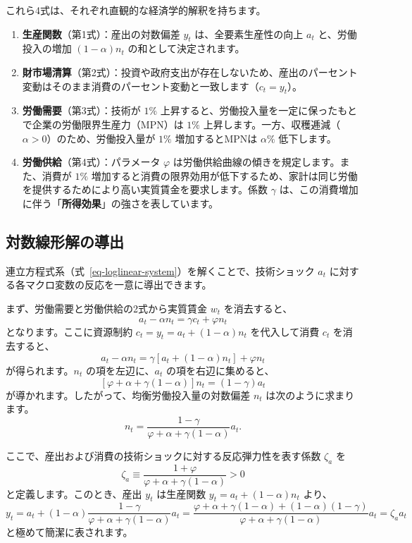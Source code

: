 \documentclass[
  japanese,
  lualatex,
  ja=standard,
  12pt,
  a4paper]{ltjsarticle}
\providecommand{\tightlist}{%
  \setlength{\itemsep}{0pt}\setlength{\parskip}{0pt}}
\begin{document}
これら4式は、それぞれ直観的な経済学的解釈を持ちます。

\begin{enumerate}
\def\labelenumi{\arabic{enumi}.}
\tightlist
\item
  \textbf{生産関数}（第1式）：産出の対数偏差 \(y_t\)
  は、全要素生産性の向上 \(a_t\) と、労働投入の増加 \((1-\alpha)n_t\)
  の和として決定されます。
\item
  \textbf{財市場清算}（第2式）：投資や政府支出が存在しないため、産出のパーセント変動はそのまま消費のパーセント変動と一致します（\(c_t = y_t\)）。
\item
  \textbf{労働需要}（第3式）：技術が \(1\%\)
  上昇すると、労働投入量を一定に保ったもとで企業の労働限界生産力（MPN）は
  \(1\%\)
  上昇します。一方、収穫逓減（\(\alpha > 0\)）のため、労働投入量が
  \(1\%\) 増加するとMPNは \(\alpha\%\) 低下します。
\item
  \textbf{労働供給}（第4式）：パラメータ \(\varphi\)
  は労働供給曲線の傾きを規定します。また、消費が \(1\%\)
  増加すると消費の限界効用が低下するため、家計は同じ労働を提供するためにより高い実質賃金を要求します。係数
  \(\gamma\)
  は、この消費増加に伴う「\textbf{所得効果}」の強さを表しています。
\end{enumerate}

\subsection{対数線形解の導出}\label{ux5bfeux6570ux7ddaux5f62ux89e3ux306eux5c0eux51fa}

連立方程式系（式~\ref{eq-loglinear-system}）を解くことで、技術ショック
\(a_t\) に対する各マクロ変数の反応を一意に導出できます。

まず、労働需要と労働供給の2式から実質賃金 \(w_t\) を消去すると、 \[
a_t - \alpha n_t = \gamma c_t + \varphi n_t
\] となります。ここに資源制約 \(c_t = y_t = a_t + (1-\alpha)n_t\)
を代入して消費 \(c_t\) を消去すると、 \[
a_t - \alpha n_t = \gamma \left[ a_t + (1-\alpha)n_t \right] + \varphi n_t
\] が得られます。\(n_t\) の項を左辺に、\(a_t\) の項を右辺に集めると、 \[
\left[ \varphi + \alpha + \gamma(1-\alpha) \right] n_t = (1-\gamma) a_t
\] が導かれます。したがって、均衡労働投入量の対数偏差 \(n_t\)
は次のように求まります。 \[
n_t = \frac{1-\gamma}{\varphi + \alpha + \gamma(1-\alpha)} a_t.
\]

ここで、産出および消費の技術ショックに対する反応弾力性を表す係数
\(\zeta_a\) を \[
\zeta_a \equiv \frac{1+\varphi}{\varphi + \alpha + \gamma(1-\alpha)} > 0
\] と定義します。このとき、産出 \(y_t\) は生産関数
\(y_t = a_t + (1-\alpha)n_t\) より、 \[
y_t = a_t + (1-\alpha) \frac{1-\gamma}{\varphi + \alpha + \gamma(1-\alpha)} a_t = \frac{\varphi + \alpha + \gamma(1-\alpha) + (1-\alpha)(1-\gamma)}{\varphi + \alpha + \gamma(1-\alpha)} a_t = \zeta_a a_t
\] と極めて簡潔に表されます。
\end{document}
